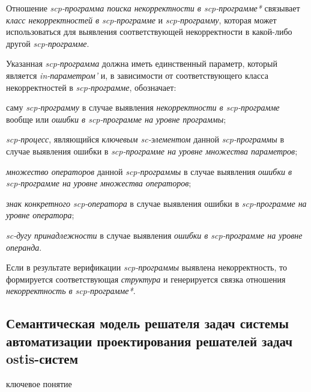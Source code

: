 \begin{SCn}
\begin{scnindent}
\end{scnindent}

\end{SCn}

Отношение \textit{scp-программа поиска некорректности в scp-программе*} связывает \textit{класс некорректностей в scp-программе} и \textit{scp-программу}, которая может использоваться для выявления соответствующей некорректности в какой-либо другой \textit{scp-программе}. 

Указанная \textit{scp-программа} должна иметь единственный параметр, который является \textit{in-параметром’} и, в зависимости от соответствующего класса некорректностей в \textit{scp-программе}, обозначает:

\begin{textitemize}
    \item саму \textit{scp-программу} в случае выявления \textit{некорректности в scp-программе} вообще или \textit{ошибки в scp-программе на уровне программы};
    \item \textit{scp-процесс}, являющийся \textit{ключевым sc-элементом} данной \textit{scp-программы} в случае выявления ошибки в \textit{scp-программе на уровне множества параметров};
    \item \textit{множество операторов} данной \textit{scp-программы} в случае выявления \textit{ошибки в scp-программе на уровне множества операторов};
    \item \textit{знак конкретного scp-оператора} в случае выявления ошибки в \textit{scp-программе на уровне оператора};
    \item \textit{sc-дугу принадлежности} в случае выявления \textit{ошибки в scp-программе на уровне операнда}.
\end{textitemize}

Если в результате верификации \textit{scp-программы} выявлена некорректность, то формируется соответствующая \textit{структура} и генерируется связка отношения \textit{некорректность в scp-программе*}.

\subsection{Семантическая модель решателя задач системы автоматизации проектирования решателей задач ostis-систем}
\begin{SCn}
\bigskip

\begin{scnrelfromlist}{ключевое понятие}
\end{scnrelfromlist}
\end{SCn}
\label{sub_sec_ps_ps_des_auto_sys}

